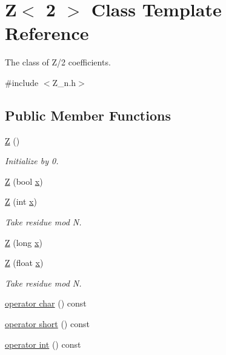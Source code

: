 \hypertarget{classZ_3_012_01_4}{}\section{Z$<$ 2 $>$ Class Template Reference}
\label{classZ_3_012_01_4}


The class of Z/2 coefficients.  




{\ttfamily \#include $<$Z\+\_\+n.\+h$>$}

\subsection*{Public Member Functions}
\begin{DoxyCompactItemize}
\item 
\hyperlink{classZ_3_012_01_4_a2007d91fc07c751853ae945c0ece1c94}{Z} ()
\begin{DoxyCompactList}\small\item\em Initialize by 0. \end{DoxyCompactList}\item 
\hyperlink{classZ_3_012_01_4_a42d7b146ce0e257ea7a7cc79e6140872}{Z} (bool \hyperlink{classZ_3_012_01_4_ae753e180f5d8aa55370a497e2c86fbb8}{x})
\item 
\hyperlink{classZ_3_012_01_4_af7537f8b8e6ba15f7715354a644fb9c6}{Z} (int \hyperlink{classZ_3_012_01_4_ae753e180f5d8aa55370a497e2c86fbb8}{x})
\begin{DoxyCompactList}\small\item\em Take residue mod N. \end{DoxyCompactList}\item 
\hyperlink{classZ_3_012_01_4_aa57d3e40cabfe96ea16901ecda68a124}{Z} (long \hyperlink{classZ_3_012_01_4_ae753e180f5d8aa55370a497e2c86fbb8}{x})
\item 
\hyperlink{classZ_3_012_01_4_a59bbd8b973581a967e8af5d3136ae439}{Z} (float \hyperlink{classZ_3_012_01_4_ae753e180f5d8aa55370a497e2c86fbb8}{x})
\begin{DoxyCompactList}\small\item\em Take residue mod N. \end{DoxyCompactList}\item 
\hyperlink{classZ_3_012_01_4_a3ecfc6d71107934335d39749dbf74b96}{operator char} () const
\item 
\hyperlink{classZ_3_012_01_4_a69f54f9228c40f6b086c9a86a9869c09}{operator short} () const
\item 
\hyperlink{classZ_3_012_01_4_a500586e2f466e294693a26c09fa1a1ae}{operator int} () const

\end{DoxyCompactItemize}
